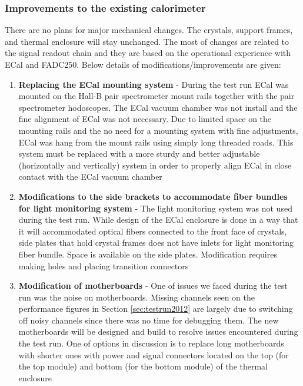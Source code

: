 \subsubsection{Improvements to the existing calorimeter}

There are no plans for major mechanical changes. The crystals, support frames, and thermal enclosure will stay unchanged. The most of changes are related to the signal readout chain and they are based on the operational experience with ECal and FADC250. Below details of modifications/improvements are given: 

\begin{enumerate}
\item {\bf Replacing the ECal mounting system} - 
During the test run ECal was mounted on the Hall-B pair spectrometer mount rails together with the pair spectrometer hodoscopes. The ECal vacuum chamber was not install and the fine alignment of ECal was not necessary. Due to limited space on the mounting rails and the no need for a mounting system with fine adjustments, ECal was hang from the mount rails using simply long threaded roads. This system must be replaced with a more sturdy and better adjustable (horizontally and vertically) system in order to properly align ECal in close contact with the ECal vacuum chamber

\item {\bf Modifications to the side brackets to accommodate fiber bundles for light monitoring system} -
The light monitoring system was not used during the test run. While design of the ECal enclosure is done in a way that it will accommodated optical fibers connected to the front face of crystals, side plates that hold crystal frames does not have inlets for light monitoring fiber bundle. Space is available on the side plates. Modification requires making holes and placing transition connectors  
    
\item {\bf Modification of motherboards} - One of issues we faced during the test run was the noise on motherboards. Missing channels seen on the performance figures in Section \ref{sec:testrun2012} are largely due to switching off noisy channels since there was no time for debugging them. The new motherboards will be designed and build to resolve issues encountered during the test run. One of options in discussion is to replace long motherboards with shorter ones with power and signal connectors located on the top (for the top module) and bottom (for the bottom module) of the thermal enclosure


\end{enumerate}
